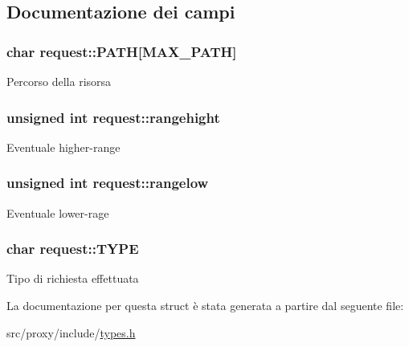 \subsection{Documentazione dei campi}
\hypertarget{structrequest_a57b4438b836ceeb60da037e42ae402a2}{
\subsubsection[{PATH}]{\setlength{\rightskip}{0pt plus 5cm}char {\bf request::PATH}\mbox{[}MAX\_\-PATH\mbox{]}}}
\label{structrequest_a57b4438b836ceeb60da037e42ae402a2}
Percorso della risorsa \hypertarget{structrequest_a0b27c2650c7ee47d638b89d1398177fc}{
\subsubsection[{rangehight}]{\setlength{\rightskip}{0pt plus 5cm}unsigned int {\bf request::rangehight}}}
\label{structrequest_a0b27c2650c7ee47d638b89d1398177fc}
Eventuale higher-\/range \hypertarget{structrequest_ac8e95bcd354032facb72350865d93654}{
\subsubsection[{rangelow}]{\setlength{\rightskip}{0pt plus 5cm}unsigned int {\bf request::rangelow}}}
\label{structrequest_ac8e95bcd354032facb72350865d93654}
Eventuale lower-\/rage \hypertarget{structrequest_ac447850484fbd4c1c9452883f3d19a29}{
\subsubsection[{TYPE}]{\setlength{\rightskip}{0pt plus 5cm}char {\bf request::TYPE}}}
\label{structrequest_ac447850484fbd4c1c9452883f3d19a29}
Tipo di richiesta effettuata 

La documentazione per questa struct è stata generata a partire dal seguente file:\begin{DoxyCompactItemize}
\item 
src/proxy/include/\hyperlink{types_8h}{types.h}\end{DoxyCompactItemize}
